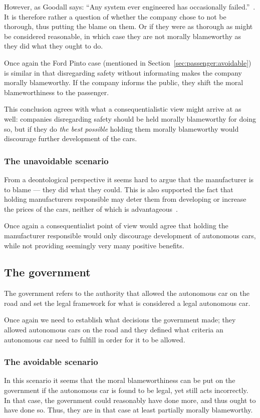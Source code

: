 However, as Goodall says:
``Any system ever engineered has occasionally failed.''~\cite{goodall_2014_machine_meaav}.
It is therefore rather a question of whether the company chose to not be
thorough, thus putting the blame on them. Or if they were as thorough as might
be considered reasonable, in which case they are not morally blameworthy as they
did what they ought to do.

Once again the Ford Pinto case (mentioned in
Section~\ref{sec:passenger:avoidable}) is similar in that disregarding safety
without informating makes the company morally blameworthy. If the company
informs the public, they shift the moral blameworthiness to the passenger.

This conclusion agrees with what a consequentialistic view might arrive at as
well: companies disregarding safety should be held morally blameworthy for doing
so, but if they do \textit{the best possible} holding them morally blameworthy
would discourage further development of the cars.

\subsubsection{The unavoidable scenario}
From a deontological perspective it seems hard to argue that the manufacturer is
to blame --- they did what they could. This is also supported the fact that
holding manufacturers responsible may deter them from developing or increase the
prices of the cars, neither of which is advantageous~\cite{marchant_2012_coming_ccbavatlst}.

Once again a consequentialist point of view would agree that holding the
manufacturer responsible would only discourage development of autonomous cars,
while not providing seemingly very many positive benefits.

\subsection{The government}
The government refers to the authority that allowed the autonomous car on the
road and set the legal framework for what is considered a legal autonomous car.

Once again we need to establish what decisions the government made; they allowed
autonomous cars on the road and they defined what criteria an autonomous car
need to fulfill in order for it to be allowed.

\subsubsection{The avoidable scenario}
In this scenario it seems that the moral blameworthiness can be put on the
government if the autonomous car is found to be legal, yet still acts
incorrectly. In that case, the government could reasonably have done more, and
thus ought to have done so. Thus, they are in that case at least partially
morally blameworthy.

